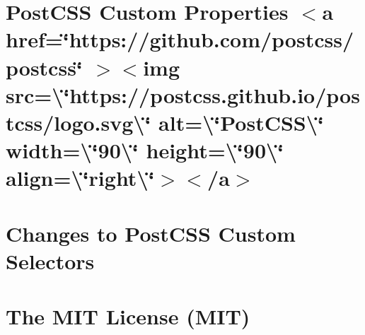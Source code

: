 \documentclass[twoside]{book}
\newcommand{\+}{\discretionary{\mbox{\scriptsize$\hookleftarrow$}}{}{}}
\begin{document}
\chapter{Post\+CSS Custom Properties \texorpdfstring{$<$}{<}a href=\char`\"{}https\+://github.\+com/postcss/postcss\char`\"{} \texorpdfstring{$>$}{>}\texorpdfstring{$<$}{<}img src=\textbackslash{}\char`\"{}https\+://postcss.\+github.\+io/postcss/logo.\+svg\textbackslash{}\char`\"{} alt=\textbackslash{}\char`\"{}\+Post\+CSS\textbackslash{}\char`\"{} width=\textbackslash{}\char`\"{}90\textbackslash{}\char`\"{} height=\textbackslash{}\char`\"{}90\textbackslash{}\char`\"{} align=\textbackslash{}\char`\"{}right\textbackslash{}\char`\"{}\texorpdfstring{$>$}{>}\texorpdfstring{$<$}{<}/a\texorpdfstring{$>$}{>}}
\label{md__c___users_vaishnavi_jadhav__desktop__developer_code_mean_stack_example_client_node_modules_p962fd4538515bd985d9cfa9056b267e6}

\chapter{Changes to Post\+CSS Custom Selectors}
\label{md__c___users_vaishnavi_jadhav__desktop__developer_code_mean_stack_example_client_node_modules_pb01dc1ead2889c61239ecb946b20b775}

\chapter{The MIT License (MIT)}
\label{md__c___users_vaishnavi_jadhav__desktop__developer_code_mean_stack_example_client_node_modules_pb7875d996809f4ec7466317f276108dd}

\end{document}

